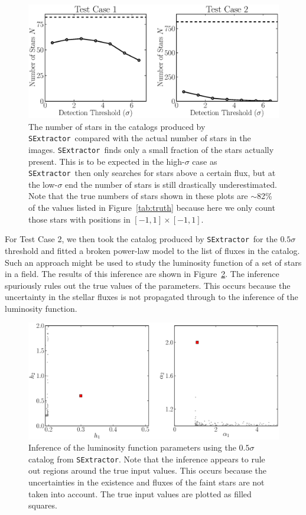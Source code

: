 \documentclass[12pt, preprint]{aastex}
\newcommand{\sex}{{\tt SExtractor}}
\begin{document}
\begin{figure}[ht!]
\begin{center}
\includegraphics[width=\textwidth]{Figures/sex_N.eps}
\end{center}
\caption{The number of stars in the catalogs produced by \sex~compared with the
actual number of stars in the images. \sex~finds only a small fraction of the
stars actually present. This is to be expected in the high-$\sigma$ case as
\sex~then only searches for stars above a certain flux, but at the low-$\sigma$
end the number of stars is still drastically underestimated. Note that the true
numbers
of stars shown in these plots are $\sim$82\% of the values listed in
Figure~\ref{tab:truth} because here we only count those stars with positions
in $[-1, 1] \times [-1, 1]$.
\label{fig:sex_N}}
\end{figure}

For Test Case 2, we then took the catalog produced by \sex~for the $0.5\sigma$
threshold and fitted a broken power-law model to the list of fluxes in the catalog.
Such an approach might be used to study the luminosity function of a set of stars
in a field. The results of this inference are shown in Figure~\ref{fig:sex_inference}.
The inference spuriously rules out the true values of the parameters. This
occurs because the uncertainty in the stellar fluxes is not propagated through
to the inference of the luminosity function.

\begin{figure}[ht!]
\begin{center}
\includegraphics[width=\textwidth]{Figures/sex_inference.eps}
\end{center}
\caption{Inference of the luminosity function parameters using the $0.5\sigma$
catalog from \sex. Note that the inference appears to rule out regions around
the true input values. This occurs because the uncertainties in the existence
and fluxes of the faint stars are not taken into account. The true input values are plotted as filled squares.
\label{fig:sex_inference}}
\end{figure}
\end{document}
